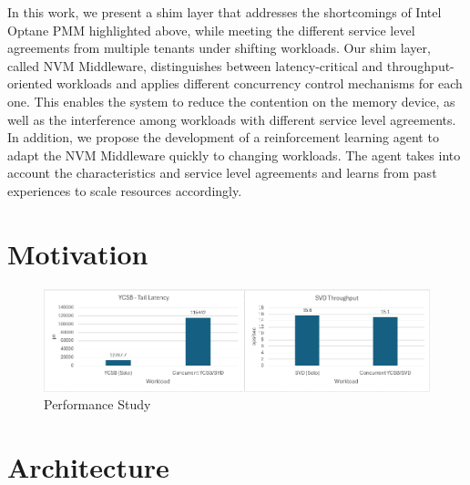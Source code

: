 In this work, we present a shim layer that addresses the shortcomings of Intel Optane PMM highlighted above, while meeting the different service level agreements from multiple tenants under shifting workloads. Our shim layer, called NVM Middleware, distinguishes between latency-critical and throughput-oriented workloads and applies different concurrency control mechanisms for each one. This enables the system to reduce the contention on the memory device, as well as the interference among workloads with different service level agreements. In addition, we propose the development of a reinforcement learning agent to adapt the NVM Middleware quickly to changing workloads. The agent takes into account the characteristics and service level agreements and learns from past experiences to scale resources accordingly.


\section{Motivation}

\begin{figure}[ht]
  \centering
  \includegraphics[scale=0.6]{images/nvm-motivation-sla.png}
  \caption[Performance Study]{Performance Study}
\end{figure}

\section{Architecture}

